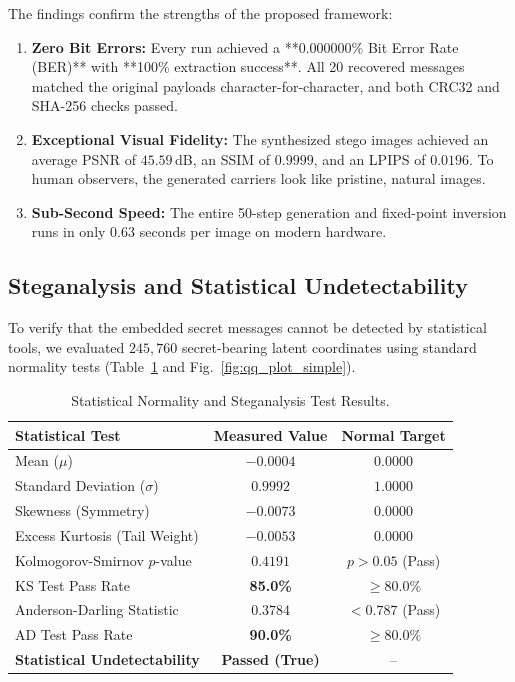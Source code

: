 \documentclass[conference]{IEEEtran}
\begin{document}
The findings confirm the strengths of the proposed framework:
\begin{enumerate}
    \item \textbf{Zero Bit Errors:} Every run achieved a **0.000000\% Bit Error Rate (BER)** with **100\% extraction success**. All 20 recovered messages matched the original payloads character-for-character, and both CRC32 and SHA-256 checks passed.
    \item \textbf{Exceptional Visual Fidelity:} The synthesized stego images achieved an average PSNR of $45.59$\,dB, an SSIM of $0.9999$, and an LPIPS of $0.0196$. To human observers, the generated carriers look like pristine, natural images.
    \item \textbf{Sub-Second Speed:} The entire 50-step generation and fixed-point inversion runs in only $0.63$ seconds per image on modern hardware.
\end{enumerate}

\subsection{Steganalysis and Statistical Undetectability}
To verify that the embedded secret messages cannot be detected by statistical tools, we evaluated $245{,}760$ secret-bearing latent coordinates using standard normality tests (Table~\ref{tab:steganalysis_results} and Fig.~\ref{fig:qq_plot_simple}).

\begin{table}[h]
\centering
\caption{Statistical Normality and Steganalysis Test Results.}
\label{tab:steganalysis_results}
\begin{tabular}{lcc}
\toprule
\textbf{Statistical Test} & \textbf{Measured Value} & \textbf{Normal Target} \\
\midrule
Mean ($\mu$) & $-0.0004$ & $0.0000$ \\
Standard Deviation ($\sigma$) & $0.9992$ & $1.0000$ \\
Skewness (Symmetry) & $\mathbf{-0.0073}$ & $0.0000$ \\
Excess Kurtosis (Tail Weight) & $\mathbf{-0.0053}$ & $0.0000$ \\
Kolmogorov-Smirnov $p$-value & $\mathbf{0.4191}$ & $p > 0.05$ (Pass) \\
KS Test Pass Rate & \textbf{85.0\%} & $\ge 80.0\%$ \\
Anderson-Darling Statistic & $\mathbf{0.3784}$ & $< 0.787$ (Pass) \\
AD Test Pass Rate & \textbf{90.0\%} & $\ge 80.0\%$ \\
\textbf{Statistical Undetectability} & \textbf{Passed (True)} & -- \\
\bottomrule
\end{tabular}
\end{table}
\end{document}
